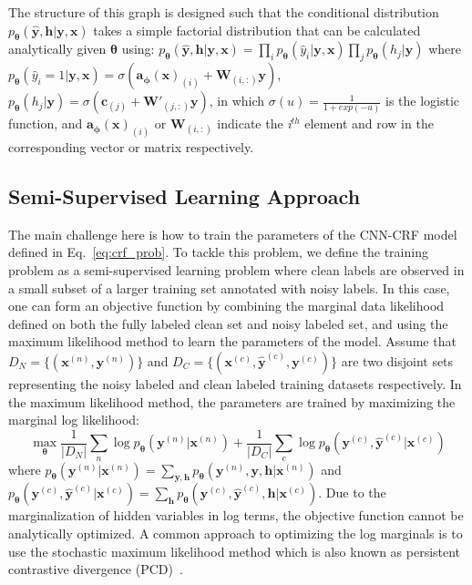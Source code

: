 \documentclass{article}
\newcommand{\x}{{\pmb{x}}}
\newcommand{\y}{{\pmb{y}}}
\newcommand{\yh}{{\hat{\pmb{y}}}}
\newcommand{\h}{{\pmb{h}}}
\renewcommand{\a}{{\pmb{a}}}
\renewcommand{\c}{{\pmb{c}}}
\newcommand{\W}{{\pmb{W}}}
\newcommand{\btheta}{{\pmb{\theta}}}
\newcommand{\bphi}{{\pmb{\phi}}}
\begin{document}
The structure of this graph is designed such that
the conditional distribution $p_\btheta(\yh, \h| \y, \x)$ takes a simple factorial distribution that can be calculated analytically given $\btheta$ using:
{\small $p_\btheta(\yh, \h| \y, \x) = \prod_{i} p_\btheta(\hat{y}_i| \y, \x) \prod_{j} p_\btheta(h_j| \y)$}
where {\small $ p_\btheta(\hat{y}_i=1| \y, \x) = \sigma(\a_\bphi(\x)_{(i)} + \W_{(i,:)}\y)$}, {\small $p_\btheta(h_j| \y)  = \sigma(\c_{(j)} + \W'_{(j,:)}\y)$}, in which
$\sigma(u) = \frac{1}{1+exp(-u)}$ is the logistic function, and
$\a_\bphi(\x)_{(i)}$ or $\W_{(i,:)}$ indicate the \textit{i}$^{th}$ element and row in the corresponding vector or matrix respectively.


\subsection{Semi-Supervised Learning Approach}
The main challenge here is how to train the parameters of the CNN-CRF model defined in Eq.~\ref{eq:crf_prob}. 
To tackle this problem, we define the training problem as a semi-supervised learning problem where clean labels 
are observed in a small subset of a larger training set annotated with noisy labels. In this case, one can form an objective function by combining 
the marginal data likelihood defined on both the fully labeled clean set and noisy 
labeled set, and using the maximum likelihood method to learn the parameters of the model.
Assume that {\small $D_N = \{ (\x^{(n)}, \y^{(n)})\}$ and $D_C = \{ (\x^{(c)}, \yh^{(c)}, \y^{(c)})\}$}
are two disjoint sets representing the noisy labeled and clean labeled training datasets respectively. 
In the maximum likelihood method, the parameters are trained by maximizing the marginal log likelihood:
\begin{equation} \label{eq:training_naive}
\max_{\btheta} \frac{1}{|D_N|} \sum_n \log p_\btheta(\y^{(n)}|\x^{(n)}) + \frac{1}{|D_C|} \sum_c \log p_\btheta(\y^{(c)}, \yh^{(c)}|\x^{(c)})
\end{equation}
where {\small$p_\btheta(\y^{(n)}|\x^{(n)}) = \sum_{\y, \h} p_\btheta(\y^{(n)}, \y, \h|\x^{(n)})$ and $p_\btheta(\y^{(c)}, \yh^{(c)}|\x^{(c)}) = \sum_{\h} p_\btheta(\y^{(c)}, \yh^{(c)}, \h|\x^{(c)})$}.
Due to the marginalization of hidden variables in log terms, the objective function cannot be analytically optimized.
A common approach to optimizing the log marginals is to use the stochastic maximum 
likelihood method which is also known as persistent contrastive divergence (PCD)~\cite{tieleman2008training, younes1989parametric,kirillov2015joint}. 
\end{document}
